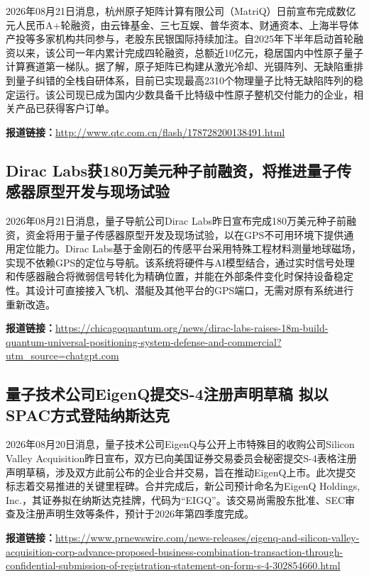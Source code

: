 \documentclass[12pt,a4paper]{ctexart}
\begin{document}
2026年08月21日消息，杭州原子矩阵计算有限公司（MatriQ）日前宣布完成数亿元人民币A+轮融资，由云锋基金、三七互娱、普华资本、财通资本、上海半导体产投等多家机构共同参与，老股东民银国际持续加注。自2025年下半年启动首轮融资以来，该公司一年内累计完成四轮融资，总额近10亿元，稳居国内中性原子量子计算赛道第一梯队。据了解，原子矩阵已构建从激光冷却、光镊阵列、无缺陷重排到量子纠错的全栈自研体系，目前已实现最高2310个物理量子比特无缺陷阵列的稳定运行。该公司现已成为国内少数具备千比特级中性原子整机交付能力的企业，相关产品已获得客户订单。

\noindent\textbf{报道链接：}\url{http://www.qtc.com.cn/flash/178728200138491.html}

\subsection{ Dirac Labs获180万美元种子前融资，将推进量子传感器原型开发与现场试验 }

2026年08月21日消息，量子导航公司Dirac Labs昨日宣布完成180万美元种子前融资，资金将用于量子传感器原型开发及现场试验，以在GPS不可用环境下提供通用定位能力。Dirac Labs基于金刚石的传感平台采用特殊工程材料测量地球磁场，实现不依赖GPS的定位与导航。该系统将硬件与AI模型结合，通过实时信号处理和传感器融合将微弱信号转化为精确位置，并能在外部条件变化时保持设备稳定性。其设计可直接接入飞机、潜艇及其他平台的GPS端口，无需对原有系统进行重新改造。

\noindent\textbf{报道链接：}\url{https://chicagoquantum.org/news/dirac-labs-raises-18m-build-quantum-universal-positioning-system-defense-and-commercial?utm\_source=chatgpt.com}

\subsection{ 量子技术公司EigenQ提交S-4注册声明草稿 拟以SPAC方式登陆纳斯达克 }

2026年08月20日消息，量子技术公司EigenQ与公开上市特殊目的收购公司Silicon Valley Acquisition昨日宣布，双方已向美国证券交易委员会秘密提交S-4表格注册声明草稿，涉及双方此前公布的企业合并交易，旨在推动EigenQ上市。此次提交标志着交易推进的关键里程碑。合并完成后，新公司预计命名为EigenQ Holdings, Inc.，其证券拟在纳斯达克挂牌，代码为“EIGQ”。该交易尚需股东批准、SEC审查及注册声明生效等条件，预计于2026年第四季度完成。

\noindent\textbf{报道链接：}\url{https://www.prnewswire.com/news-releases/eigenq-and-silicon-valley-acquisition-corp-advance-proposed-business-combination-transaction-through-confidential-submission-of-registration-statement-on-form-s-4-302854660.html}
\end{document}
